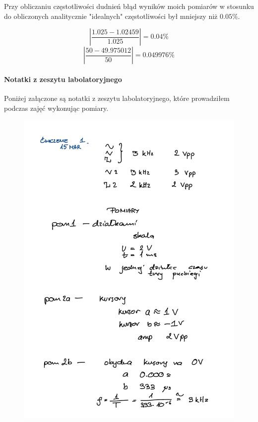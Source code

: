 \documentclass[14pt, table]{extarticle}
\begin{document}
Przy obliczaniu częstotliwości dudnień błąd wyników moich pomiarów w stosunku do obliczonych analitycznie "idealnych" częstotliwości był mniejszy niż $0.05\%$.

$$ \left| \frac{1.025 - 1.02459}{1.025} \right| = 0.04\% $$
$$ \left| \frac{50 - 49.975012}{50} \right| = 0.049976\% $$


\newpage
\paragraph{Notatki z zeszytu labolatoryjnego \\}
Poniżej załączone są notatki z zeszytu labolatoryjnego, które prowadziłem podczas zajęć wykonując pomiary.

\begin{figure}[H]
\includegraphics[scale=0.2]{B0}
\centering
\captionsetup{labelformat=empty}
\caption{}
\end{figure}
\end{document}
